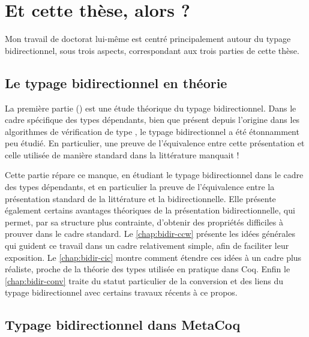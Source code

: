\section{Et cette thèse, alors ?}
\label{sec:cette-these}

Mon travail de doctorat lui-même
est centré principalement autour du typage bidirectionnel, sous
trois aspects, correspondant aux trois parties de cette thèse.

\subsection{Le typage bidirectionnel en théorie}

La première partie ()
est une étude théorique du typage bidirectionnel.
Dans le cadre spécifique des types dépendants, bien que présent depuis l’origine dans les algorithmes de vérification de type ,
le typage bidirectionnel a été étonnamment peu étudié. En particulier, une preuve
de l’équivalence entre cette présentation et celle utilisée de manière standard
dans la littérature manquait !

Cette partie répare ce manque, en étudiant le
typage bidirectionnel dans le cadre des types dépendants, et en particulier la
preuve de l’équivalence entre la présentation standard de la littérature et la
bidirectionnelle. Elle présente également
certains avantages théoriques de la présentation bidirectionnelle,
qui permet, par sa structure plus contrainte, d’obtenir des propriétés
difficiles à prouver dans le cadre standard.
Le \cref{chap:bidir-ccw} présente les idées générales qui guident ce travail
dans un cadre relativement simple, afin de faciliter leur exposition. 
Le \cref{chap:bidir-cic} montre comment étendre ces idées à un
cadre plus réaliste, proche de la théorie des types utilisée en pratique dans Coq.
Enfin le \cref{chap:bidir-conv} traite du statut particulier de la
conversion
et des liens du typage bidirectionnel avec certains travaux récents
à ce propos.

\subsection{Typage bidirectionnel dans MetaCoq}

